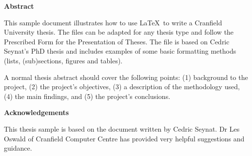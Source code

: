 


\mbox{} \vspace{25mm}

\Huge \textbf{Abstract} \normalsize

\vspace{15mm}


This sample document illustrates how to use \LaTeX\ to write a
Cranfield University thesis.  The files can be adapted for any
thesis type and follow the Prescribed Form for the Presentation of
Theses.  The file is based on Cedric Seynat's PhD thesis and
includes examples of some basic formatting methods (lists,
(sub)sections, figures and tables).

A normal thesis abstract should cover the following points: (1)
background to the project, (2) the project's objectives, (3) a
description of the methodology used, (4) the main findings, and
(5) the project's conclusions.

\pagebreak



\mbox

\pagebreak


\mbox{} \vspace{25mm}

\Huge \textbf{Acknowledgements} \normalsize

\vspace{15mm}


This thesis sample is based on the document written by Cedric
Seynat.  Dr Les Oswald of Cranfield Computer Centre has provided
very helpful suggestions and guidance.

\pagebreak



\mbox

\pagebreak
